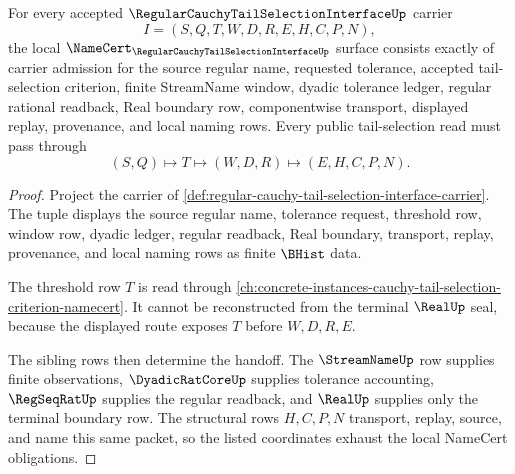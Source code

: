 \begin{theorem}
\label{thm:regular-cauchy-tail-selection-interface-namecert-obligations}
For every accepted $\RegularCauchyTailSelectionInterfaceUp$ carrier
$$
I=(S,Q,T,W,D,R,E,H,C,P,N),
$$
the local $\NameCert_{\RegularCauchyTailSelectionInterfaceUp}$ surface consists exactly of carrier admission for the source regular name, requested tolerance, accepted tail-selection criterion, finite StreamName window, dyadic tolerance ledger, regular rational readback, Real boundary row, componentwise transport, displayed replay, provenance, and local naming rows. Every public tail-selection read must pass through
$$
(S,Q)\longmapsto T\longmapsto(W,D,R)\longmapsto(E,H,C,P,N).
$$
\end{theorem}
\begin{proof}
Project the carrier of \autoref{def:regular-cauchy-tail-selection-interface-carrier}. The tuple displays the source regular name, tolerance request, threshold row, window row, dyadic ledger, regular readback, Real boundary, transport, replay, provenance, and local naming rows as finite $\BHist$ data.

The threshold row $T$ is read through \autoref{ch:concrete-instances-cauchy-tail-selection-criterion-namecert}. It cannot be reconstructed from the terminal $\RealUp$ seal, because the displayed route exposes $T$ before $W,D,R,E$.

The sibling rows then determine the handoff. The $\StreamNameUp$ row supplies finite observations, $\DyadicRatCoreUp$ supplies tolerance accounting, $\RegSeqRatUp$ supplies the regular readback, and $\RealUp$ supplies only the terminal boundary row. The structural rows $H,C,P,N$ transport, replay, source, and name this same packet, so the listed coordinates exhaust the local NameCert obligations.
\end{proof}

